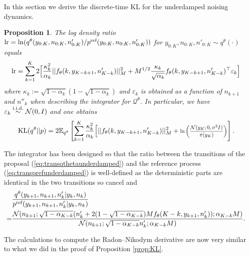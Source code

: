 \documentclass{article} %
\newtheorem{proposition}{Proposition}
\begin{document}
In this section we derive the discrete-time KL for the underdamped noising dynamics.
\begin{proposition}\label{prop:KLunderdampedDT}
The log density ratio $\textup{lr}=\log (q^{\theta}(y_{0:K},n_{0:K},n'_{0:K})/ p^{\textup{ref}}(y_{0:K},n_{0:K},n'_{0:K}))$ for $y_{0:K},n_{0:K},n'_{0:K}\sim q^{\theta}(\cdot)$ equals
\begin{equation}\label{eq:logDTRN2}
\textup{lr}=\sum_{k=1}^K 2\Bigr[\frac{\kappa^2_k}{\alpha_k}||f_{\theta}(k,y_{K-k+1},n'_{K-k})||^2_{M}+M^{1/2}\frac{\kappa_k}{\sqrt{\alpha_k}}f_{\theta}(k,y_{K-k+1},n'_{K-k})^\top \varepsilon_k  \Bigr]
\end{equation}
where $\kappa_k:=\sqrt{1-\alpha_k}(1-\sqrt{1-\alpha_k})$ and $\varepsilon_k$ is obtained as a function of $n_{k+1}$ and $n''_k$ when describing the integrator for $\mathcal{Q}^{\theta}$. In particular, we have $\varepsilon_k \overset{\textup{i.i.d.}}{\sim} \mathcal{N}(0,I)$ and one obtains
\begin{align}
    \KL(q^{\theta}||p)=2\E_{q^\theta}\left[\sum_{k=1}^K \frac{\kappa^2_k}{\alpha_k}\Bigr[||f_{\theta}(k,y_{K-k+1},n'_{K-k})||^2_{M} + \scaleobj{.8}{\ln \left(\frac{\gN(y_K; 0, \sigma^2 I)}{\pi(y_K)}\right)}\right].\label{eq:KLneatunderdamped}
\end{align}
\end{proposition}

The integrator has been designed so that the ratio between the transitions of the proposal (\ref{eq:transqthetaunderdamped}) and the reference process (\ref{eq:transprefunderdamped}) is well-defined as the deterministic parts are identical in the two transitions so cancel and 
\begin{align}\label{eq:discreteRNunderdampedSM}
    &\frac{q^\theta(y_{k+1},n_{k+1},n'_k|y_k,n_k)}{p^{\textup{ref}}(y_{k+1},n_{k+1},n'_k|y_k,n_k)}\\
    =&\frac{\mathcal{N}(n_{k+1};\sqrt{1-\alpha_{K-k}}(n'_k+2(1-\sqrt{1-\alpha_{K-k}})M f_{\theta}(K-k,y_{k+1},n'_k)); \alpha_{K-k}M)}{\mathcal{N}(n_{k+1};\sqrt{1-\alpha_{K-k}}n'_k; \alpha_{K-k}M)}.\nonumber
\end{align}

The calculations to compute the Radon--Nikodym derivative are now very similar to what we did in the proof of Proposition \ref{prop:KL}.
\end{document}
